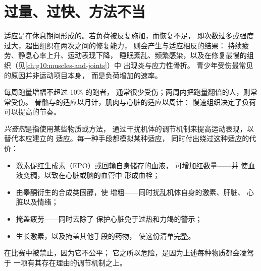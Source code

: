 \section{过量、过快、方法不当}

\begin{proposition}[过度训练与损伤]\label{prop:g10:sport-and-health:overtraining}
适应是在休息期间形成的。若负荷被反复施加，而恢复不足，
即次数过多或强度过大，超出组织在两次之间的修复能力，
则会产生与适应相反的结果：
持续疲劳、静息心率上升、运动表现下降，
睡眠紊乱、频繁感染，以及在修复最慢的组织（见\cref{ch:g10:muscles-and-joints}）中
出现炎与应力性骨折。
青少年受伤最常见的原因并非运动项目本身，
而是负荷增加的速率。
\end{proposition}
\admitted

\begin{example}[百分之十法则]\label{ex:g10:sport-and-health:tenpercent}
每周跑量增幅不超过 10\% 的跑者，
通常很少受伤；两周内把跑量翻倍的人，则常常受伤。
骨骼与的适应以月计，肌肉与心脏的适应以周计：
慢速组织决定了负荷可以提高的节奏。
\end{example}

\begin{proposition}[兴奋剂]\label{prop:g10:sport-and-health:doping}
\emph{兴奋剂}是指使用某些物质或方法，
通过干扰机体的调节机制来提高运动表现，以替代本应建立的
适应。每一种手段都模拟某种适应，
同时付出绕过这种适应的代价：
\begin{itemize}
  \item 激素促红生成素（EPO）或回输自身储存的血液，
        可增加红数量——并
        使血液变稠，以致在心脏或脑的血管中
        形成血栓；
  \item 由睾酮衍生的合成类固醇，使
        增粗——同时扰乱机体自身的激素、肝脏、
        心脏以及情绪；
  \item {}掩盖疲劳——同时去除了
        保护心脏免于过热和力竭的警示；
  \item 生长激素，以及掩盖其他手段的药物，
        使这份清单完整。
\end{itemize}
在比赛中被禁止，因为它不公平；
它之所以危险，是因为上述每种物质都会凌驾于
一项有其存在理由的调节机制之上。
\end{proposition}
\admitted

